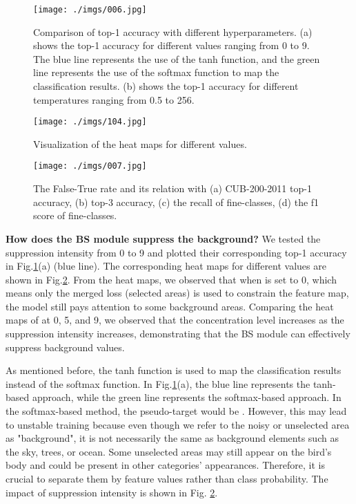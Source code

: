 \documentclass[journal]{IEEEtran}
\begin{document}
\begin{figure}[t]
    \begin{center}
    \texttt{[image: ./imgs/006.jpg]}
    \end{center}
\caption{Comparison of top-1 accuracy with different hyperparameters. (a) shows the top-1 accuracy for different  values ranging from 0 to 9. The blue line represents the use of the tanh function, and the green line represents the use of the softmax function to map the classification results. (b) shows the top-1 accuracy for different temperatures ranging from 0.5 to 256.}
\label{fig:Temperature_and_BS_lambda}
\end{figure}

\begin{figure}
    \begin{center}
    \texttt{[image: ./imgs/104.jpg]}
    \end{center}
\caption{Visualization of the heat maps for different  values.}
\label{fig:BS_Heat}
\end{figure}

\begin{figure}[t]
    \begin{center}
    \texttt{[image: ./imgs/007.jpg]}
    \end{center}
\caption{The False-True rate and its relation with (a) CUB-200-2011 top-1 accuracy, (b) top-3 accuracy, (c) the recall of fine-classes, (d) the f1 score of fine-classes.}
\label{fig:False-True}
\end{figure}

\textbf{How does the BS module suppress the background?} We tested the suppression intensity  from 0 to 9 and plotted their corresponding top-1 accuracy in Fig.\ref{fig:Temperature_and_BS_lambda}(a) (blue line). The corresponding heat maps for different  values are shown in Fig.\ref{fig:BS_Heat}. From the heat maps, we observed that when  is set to 0, which means only the merged loss (selected areas) is used to constrain the feature map, the model still pays attention to some background areas. Comparing the heat maps of  at 0, 5, and 9, we observed that the concentration level increases as the suppression intensity  increases, demonstrating that the BS module can effectively suppress background values. 

As mentioned before, the tanh function is used to map the classification results instead of the softmax function. In Fig.\ref{fig:Temperature_and_BS_lambda}(a), the blue line represents the tanh-based approach, while the green line represents the softmax-based approach. In the softmax-based method, the pseudo-target would be . However, this may lead to unstable training because even though we refer to the noisy or unselected area as "background", it is not necessarily the same as background elements such as the sky, trees, or ocean. Some unselected areas may still appear on the bird's body and could be present in other categories' appearances. Therefore, it is crucial to separate them by feature values rather than class probability. The impact of suppression intensity is shown in Fig. \ref{fig:BS_Heat}.
\end{document}
